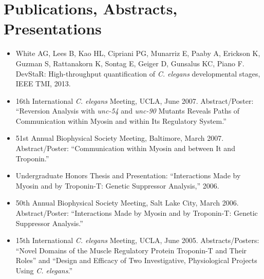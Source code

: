 \documentclass{article}
\begin{document}
	\section*{Publications, Abstracts, Presentations}
	\begin{itemize}
			\item White AG, Lees B, Kao HL, Cipriani PG, Munarriz E, Paaby A, Erickson K, Guzman S, 
			Rattanakorn K, Sontag E, Geiger D, Gunsalus KC, Piano F.
			DevStaR: High-throughput quantification of \emph{C. elegans} developmental stages, IEEE TMI, 2013.
			\item 16th International \emph{C. elegans} Meeting, UCLA, June 2007. 
			Abstract/Poster: ``Reversion Analysis with \emph{unc-54} and \emph{unc-90} Mutants Reveals Paths of Communication within Myosin and within Its Regulatory System.''
			\item 51st Annual Biophysical Society Meeting, Baltimore, March 2007.
			Abstract/Poster: ``Communication within Myosin and between It and Troponin.''
			\item Undergraduate Honors Thesis and Presentation: ``Interactions Made by Myosin and by Troponin-T: Genetic Suppressor Analysis,'' 2006.
			\item 50th Annual Biophysical Society Meeting, Salt Lake City, March 2006.
			Abstract/Poster: ``Interactions Made by Myosin and by Troponin-T: Genetic Suppressor Analysis.''
			\item 15th International \emph{C. elegans} Meeting, UCLA, June 2005.
			Abstracts/Posters: ``Novel Domains of the Muscle Regulatory Protein Troponin-T and Their Roles'' and 
			``Design and Efficacy of Two Investigative, Physiological Projects Using \emph{C. elegans}.''
	\end{itemize}
\end{document}
